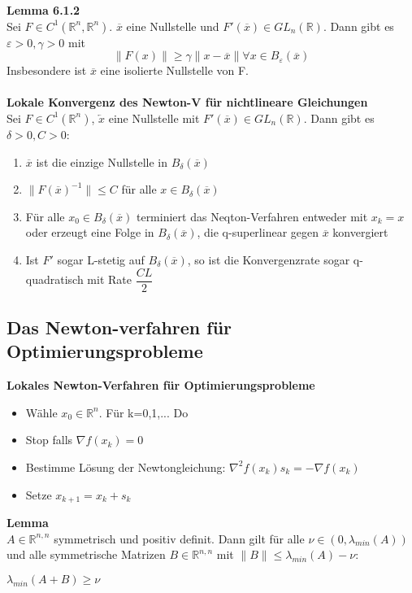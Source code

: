 \documentclass[a4paper,10pt]{article}
\begin{document}
\textbf{Lemma 6.1.2}\\
Sei $F\in C^1(\mathbb{R}^n,\mathbb{R}^n)$. $\overline{x}$ eine Nullstelle und $F'(\overline{x})\in GL_n(\mathbb{R})$. Dann gibt es $\varepsilon>0, \gamma >0$ mit 
\begin{equation}
\|F(x)\| \geq \gamma \|x-\overline{x}\| \forall x\in B_{\varepsilon}(\overline{x})
\end{equation}
Insbesondere ist $\overline{x}$ eine isolierte Nullstelle von F.
\\
\\
\textbf{Lokale Konvergenz des Newton-V für nichtlineare Gleichungen}\\
Sei $F\in C^1(\mathbb{R}^n)$, $\overleftarrow{x} $ eine Nullstelle mit $F'(\overline{x})\in GL_n(\mathbb{R})$. Dann gibt es $\delta >0, C>0$:
\begin{enumerate}
\item $\overline{x}$ ist die einzige Nullstelle in $B_{\delta}(\overline{x})$
\item $\|F(\overline{x})^{-1}\|\leq C$ für alle $x\in B_{\delta}(\overline{x})$
\item Für alle $x_0\in B_{\delta}(\overline{x})$ terminiert das Neqton-Verfahren entweder mit $x_k=x$ oder erzeugt eine Folge in $B_{\delta}(\overline{x})$, die q-superlinear gegen $\overline{x}$ konvergiert
\item Ist $F'$ sogar L-stetig auf $B_{\delta}(\overline{x})$, so ist die Konvergenzrate sogar q-quadratisch mit Rate $\dfrac{CL}{2}$
\end{enumerate}

\subsection{Das Newton-verfahren für Optimierungsprobleme}
\textbf{Lokales Newton-Verfahren für Optimierungsprobleme}
\begin{itemize}
\item Wähle $x_0\in \mathbb{R}^n$. Für k=0,1,... Do
\item Stop falls $\nabla f(x_k)=0$
\item Bestimme Lösung der Newtongleichung: $\nabla^2f(x_k)s_k=-\nabla f(x_k)$
\item Setze $x_{k+1}=x_k+s_k$
\end{itemize}

\textbf{Lemma}\\
$A\in \mathbb{R}^{n,n}$ symmetrisch und positiv definit. Dann gilt für alle $\nu \in (0,\lambda_{min}(A))$ und alle symmetrische Matrizen $B\in \mathbb{R}^{n,n}$ mit $\|B\|\leq \lambda_{min}(A)-\nu$:
\begin{center}
$\lambda_{min}(A+B)\geq \nu$
\end{center}
\end{document}
